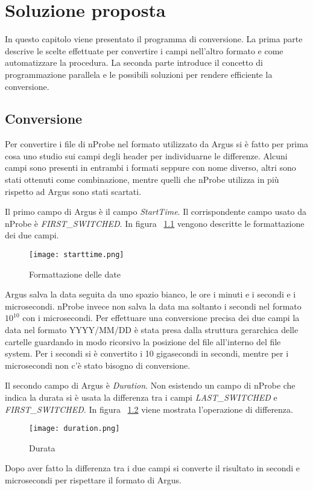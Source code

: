 \documentclass[../main.tex]{subfiles}
\begin{document}
\chapter{Soluzione proposta}

In questo capitolo viene presentato il programma di conversione. La prima parte descrive le scelte effettuate per convertire i campi nell'altro formato e come automatizzare la procedura. La seconda parte introduce il concetto di programmazione parallela e le possibili soluzioni per rendere efficiente la conversione.


\section{Conversione}
Per convertire i file di nProbe nel formato utilizzato da Argus si è fatto per prima cosa uno studio sui campi degli header per individuarne le differenze. Alcuni campi sono presenti in entrambi i formati seppure con nome diverso, altri sono stati ottenuti come combinazione, mentre quelli che nProbe utilizza in più rispetto ad Argus sono stati scartati. 

Il primo campo di Argus è il campo \textit{StartTime}. Il corrispondente campo usato da nProbe è \textit{FIRST\_SWITCHED}. In figura ~\ref{fig:starttime} vengono descritte le formattazione dei due campi.
\begin{figure}[H]
				\centering
\texttt{[image: starttime.png]}
				\caption{Formattazione delle date}
				\label{fig:starttime}
\end{figure}
Argus salva la data seguita da uno spazio bianco, le ore i minuti e i secondi e i microsecondi. nProbe invece non salva la data ma soltanto i secondi nel formato $10^{10}$ con i microsecondi. Per effettuare una conversione precisa dei due campi la data nel formato YYYY/MM/DD è stata presa dalla struttura gerarchica delle cartelle guardando in modo ricorsivo la posizione del file all'interno del file system. Per i secondi si è convertito i 10 gigasecondi in secondi, mentre per i microsecondi non c'è stato bisogno di conversione.

Il secondo campo di Argus è \textit{Duration}. Non esistendo un campo di nProbe che indica la durata si è usata la differenza tra i campi \textit{LAST\_SWITCHED} e \textit{FIRST\_SWITCHED}. In figura ~\ref{fig:duration} viene mostrata l'operazione di differenza.
\begin{figure}[H]
				\centering
\texttt{[image: duration.png]}
				\caption{Durata}
				\label{fig:duration}
\end{figure}
Dopo aver fatto la differenza tra i due campi si converte il risultato in secondi e microsecondi per rispettare il formato di Argus.
\end{document}
